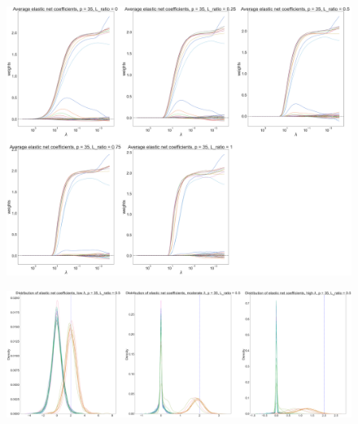 \begin{frame}[fragile]
    \begin{figure}[b]
        \includegraphics[scale=0.095]{Img/elastic_net_plot_average_betas.png}
        \centering
    \end{figure}
\end{frame}
\begin{frame}[fragile]
    \begin{figure}[b]
        \includegraphics[scale=0.09]{Img/elastic_net_shrunken_beta_dist_35_0.5.png}
        \centering
    \end{figure}
\end{frame}
